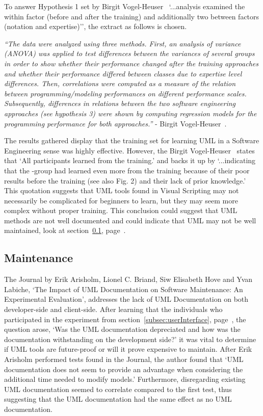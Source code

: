 \documentclass[12pt]{report} %
\begin{document}
			\newpage
			To answer Hypothesis 1 set by Birgit Vogel-Heuser~\cite{vogel-heuser_evaluation_2013} `...analysis examined the within factor (before and after the training) and additionally two between factors (notation and expertise)'', the extract as follows is chosen.
			\begin{center}
				\textit{``The data were analyzed using three methods. First, an analysis of variance (ANOVA) was applied to test differences between the variances of several groups in order to show whether their performance changed after the training approaches and whether their performance differed between classes due to expertise level differences. Then, correlations were computed as a measure of the relation between programming/modeling performances on different performance scales. Subsequently, differences in relations between the two software engineering approaches (see hypothesis 3) were shown by computing regression models for the programming performance for both approaches.''} - Birgit Vogel-Heuser~\cite{vogel-heuser_evaluation_2013}. 
			\end{center}
				
		

			The results gathered display that the training set for learning UML in a Software Engineering sense was highly effective. However, the Birgit Vogel-Heuser~\cite{vogel-heuser_evaluation_2013} states that `All participants learned from the training.' and backs it up by `...indicating that the -group had learned even more from the training because of their poor results before the training (see also Fig. 2) and their lack of prior knowledge.' This quotation suggests that UML tools found in Visual Scripting may not necessarily be complicated for beginners to learn, but they may seem more complex without proper training. This conclusion could suggest that UML methods are not well documented and could indicate that UML may not be well maintained, look at section~\ref{subsec:maintenance}, page~\pageref{subsec:maintenance}.

		\subsection{Maintenance}
		\label{subsec:maintenance}
			The Journal by Erik Arisholm, Lionel C. Briand, Siw Elisabeth Hove and Yvan Labiche, `The Impact of UML Documentation on Software Maintenance: An Experimental Evaluation', addresses the lack of UML Documentation on both developer-side and client-side. After learning that the individuals who participated in the experiment from section~\ref{subsec:userInterface}, page~\pageref{subsec:userInterface}, the question arose, `Was the UML documentation depreciated and how was the documentation withstanding on the development side?' it was vital to determine if UML tools are future-proof or will it prove expensive to maintain. After Erik Arisholm performed tests found in the Journal, the author found that `UML documentation does not seem to provide an advantage when considering the additional time needed to modify models.' Furthermore, disregarding existing UML documentation seemed to correlate compared to the first test, thus suggesting that the UML documentation had the same effect as no UML documentation.
\end{document}

